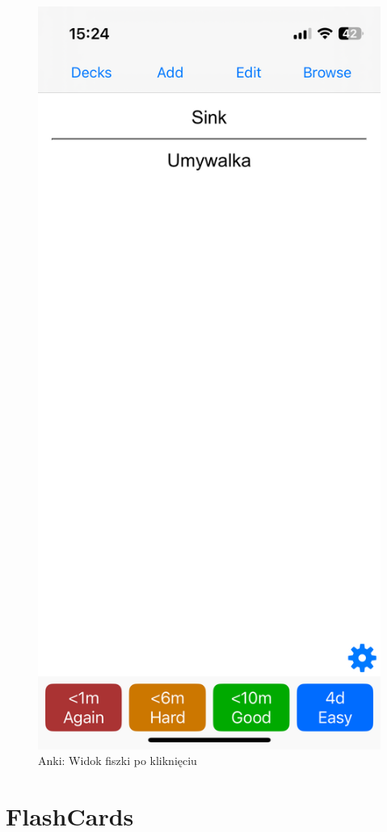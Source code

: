 \documentclass[final,a4paper,openany,12pt]{mwbk}
\begin{document}
\begin{figure}[H]
\begin{minipage}{0.5\textwidth}
  \includegraphics[width=.75\linewidth]{img/anki4.PNG}
  \caption{Anki: Widok fiszki po kliknięciu}
  \label{fig:anki4}
\end{minipage}
\end{figure}

\section{FlashCards}
\end{document}

